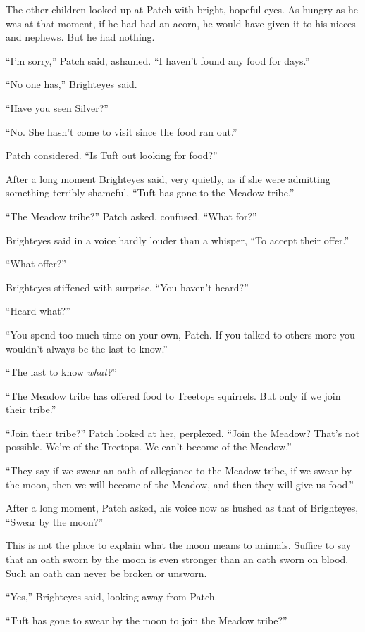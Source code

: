 \documentclass[ebook,oneside,openany,17pt]{memoir}
\begin{document}
The other children looked up at Patch with bright, hopeful eyes. As
hungry as he was at that moment, if he had had an acorn, he would have
given it to his nieces and nephews. But he had nothing.

“I’m sorry,” Patch said, ashamed. “I haven’t found any food for days.”

“No one has,” Brighteyes said.

“Have you seen Silver?”

“No. She hasn’t come to visit since the food ran out.”

Patch considered. “Is Tuft out looking for food?”

After a long moment Brighteyes said, very quietly, as if she were
admitting something terribly shameful, “Tuft has gone to the Meadow
tribe.”

“The Meadow tribe?” Patch asked, confused. “What for?”

Brighteyes said in a voice hardly louder than a whisper, “To accept
their offer.”

“What offer?”

Brighteyes stiffened with surprise. “You haven’t heard?”

“Heard what?”

“You spend too much time on your own, Patch. If you talked to others
more you wouldn’t always be the last to know.”

“The last to know \emph{what?}”

“The Meadow tribe has offered food to Treetops squirrels. But only if
we join their tribe.”

“Join their tribe?” Patch looked at her, perplexed. “Join the Meadow?
That’s not possible. We’re of the Treetops. We can’t become of the
Meadow.”

“They say if we swear an oath of allegiance to the Meadow tribe, if we
swear by the moon, then we will become of the Meadow, and then they
will give us food.”

After a long moment, Patch asked, his voice now as hushed as that of
Brighteyes, “Swear by the moon?”

This is not the place to explain what the moon means to
animals. Suffice to say that an oath sworn by the moon is even
stronger than an oath sworn on blood. Such an oath can never be broken
or unsworn.

“Yes,” Brighteyes said, looking away from Patch.

“Tuft has gone to swear by the moon to join the Meadow tribe?”
\end{document}
